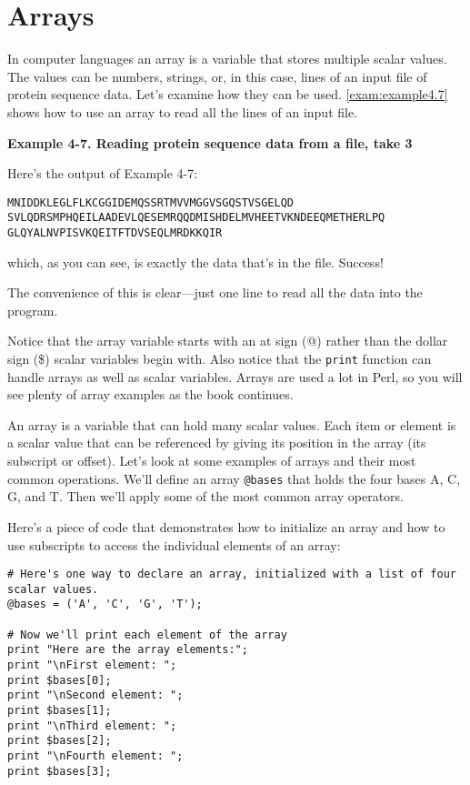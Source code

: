 \section{Arrays}
In computer languages an array is a variable that stores multiple scalar values. The values can be numbers, strings, or, in this case, lines of an input file of protein sequence data. Let's examine how they can be used. \autoref{exam:example4.7} shows how to use an array to read all the lines of an input file.

\textbf{Example 4-7. Reading protein sequence data from a file, take 3}



Here's the output of Example 4-7:

\begin{lstlisting}
MNIDDKLEGLFLKCGGIDEMQSSRTMVVMGGVSGQSTVSGELQD
SVLQDRSMPHQEILAADEVLQESEMRQQDMISHDELMVHEETVKNDEEQMETHERLPQ
GLQYALNVPISVKQEITFTDVSEQLMRDKKQIR
\end{lstlisting}

which, as you can see, is exactly the data that's in the file. Success!

The convenience of this is clear—just one line to read all the data into the program. 

Notice that the array variable starts with an at sign (@) rather than the dollar sign (\$) scalar variables begin with. Also notice that the \verb|print| function can handle arrays as well as scalar variables. Arrays are used a lot in Perl, so you will see plenty of array examples as the book continues.  

An array is a variable that can hold many scalar values. Each item or element is a scalar value that can be referenced by giving its position in the array (its subscript or offset). Let's look at some examples of arrays and their most common operations. We'll define an array \verb|@bases| that holds the four bases A, C, G, and T. Then we'll apply some of the most common array operators.

Here's a piece of code that demonstrates how to initialize an array and how to use subscripts to access the individual elements of an array: 

\begin{lstlisting}
# Here's one way to declare an array, initialized with a list of four scalar values.
@bases = ('A', 'C', 'G', 'T');

# Now we'll print each element of the array
print "Here are the array elements:";
print "\nFirst element: ";
print $bases[0];
print "\nSecond element: ";
print $bases[1];
print "\nThird element: ";
print $bases[2];
print "\nFourth element: ";
print $bases[3];
\end{lstlisting}

